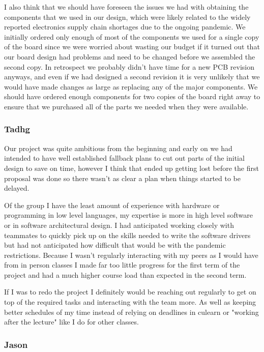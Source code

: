 I also think that we should have foreseen the issues we had with obtaining the
components that we used in our design, which were likely related to the widely
reported electronics supply chain shortages due to the ongoing pandemic. We
initially ordered only enough of most of the components we used for a single
copy of the board since we were worried about wasting our budget if it turned
out that our board design had problems and need to be changed before we
assembled the second copy. In retrospect we probably didn't have time for a new
PCB revision anyways, and even if we had designed a second revision it is very
unlikely that we would have made changes as large as replacing any of the major
components. We should have ordered enough components for two copies of the
board right away to ensure that we purchased all of the parts we needed when
they were available.

\subsubsection{Tadhg}

Our project was quite ambitious from the beginning and early on we had intended to have 
well established fallback plans to cut out parts of the initial design to save on time,
however I think that ended up getting lost before the first proposal was done so there wasn't
as clear a plan when things started to be delayed.

Of the group I have the least amount of experience with hardware or programming in low level
languages, my expertise is more in high level software or in software architectural design.
I had anticipated working closely with teammates to quickly pick up on the skills needed to 
write the software drivers but had not anticipated how difficult that would be with the pandemic
restrictions.  Because I wasn't regularly interacting with my peers as I would have from in person
classes I made far too little progress for the first term of the project and had a much higher
course load than expected in the second term.  

If I was to redo the project I definitely would be reaching out regularly to get on top of
the required tasks and interacting with the team more. As well as keeping better schedules of my time
instead of relying on deadlines in culearn or "working after the lecture" like I do for other classes.

\subsubsection{Jason}

